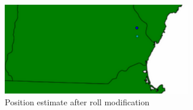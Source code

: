\documentclass[]{aiaa-tc}%
\begin{document}
\begin{figure}[b!]
\centering
\includegraphics[height=4cm]{zrollmod.png}
\caption{Position estimate after roll modification}\label{f:zrollmod}
\end{figure}
\end{document}
